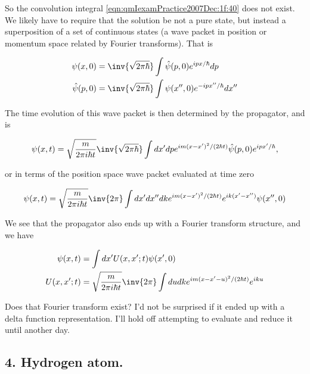 So the convolution integral \ref{eqn:qmIexamPractice2007Dec:1f:40} does not exist.  We likely have to require that the solution be not a pure state, but instead a superposition of a set of continuous states (a wave packet in position or momentum space related by Fourier transforms).  That is

\begin{align}\label{eqn:qmIexamPractice2007Dec:1f:60}
\psi(x, 0) &= 
\inv{\sqrt{2 \pi \hbar}} \int \hat{\psi}(p, 0) e^{i p x/\hbar} dp \\
\hat{\psi}(p, 0) &= 
\inv{\sqrt{2 \pi \hbar}} \int \psi(x'', 0) e^{-i p x''/\hbar} dx''
\end{align}

The time evolution of this wave packet is then determined by the propagator, and is

\begin{equation}\label{eqn:qmIexamPractice2007Dec:1f:70}
\psi(x,t) =
\sqrt{\frac{m}{2 \pi i \hbar t}} 
\inv{\sqrt{2 \pi \hbar}} 
\int dx' dp
e^{i m (x-x')^2/ (2 \hbar t)}
\hat{\psi}(p, 0) e^{i p x'/\hbar} ,
\end{equation}

or in terms of the position space wave packet evaluated at time zero

\begin{equation}\label{eqn:qmIexamPractice2007Dec:1f:80}
\psi(x,t) =
\sqrt{\frac{m}{2 \pi i \hbar t}}
\inv{2 \pi}
\int dx' dx'' dk
e^{i m (x-x')^2/ (2 \hbar t)}
e^{i k (x' - x'')} \psi(x'', 0)
\end{equation}

We see that the propagator also ends up with a Fourier transform structure, and we have

\begin{align}\label{eqn:qmIexamPractice2007Dec:1f:90}
\psi(x,t) &= \int dx' U(x, x' ; t) \psi(x', 0) \\
U(x, x' ; t) &=
\sqrt{\frac{m}{2 \pi i \hbar t}}
\inv{2 \pi}
\int du dk
e^{i m (x - x' - u)^2/ (2 \hbar t)}
e^{i k u }
\end{align}

Does that Fourier transform exist?  I'd not be surprised if it ended up with a delta function representation.  I'll hold off attempting to evaluate and reduce it until another day.

\subsection{4. Hydrogen atom.}

